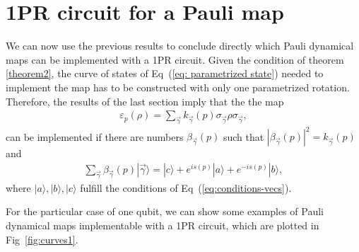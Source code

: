 \documentclass[10pt,letterpaper]{article} %
\newcommand{\fref}[1]{Fig~\ref{#1}}
\newcommand{\eref}[1]{Eq~(\ref{#1})}
\begin{document}
\section{1PR circuit for a Pauli map} %
\label{sec: 1PR circuit for a Pauli map}

We can now use the previous results to conclude directly which Pauli dynamical maps
can be implemented with a 1PR circuit.
Given the condition of theorem \ref{theorem2}, the curve of states of \eref{eq: parametrized state}  needed 
to implement the map
has to be constructed with only one parametrized rotation. 
Therefore, the results of the last section imply that the the map
\begin{eqnarray}
\varepsilon_p(\rho) = \sum_{\vec{\gamma}} k_{\vec{\gamma}}(p) \sigma_{\vec{\gamma}} \rho \sigma_{\vec{\gamma}},
\end{eqnarray}
can be implemented  if there are numbers $\beta_{\vec{\gamma}}(p)$ such that $|\beta_{\vec{\gamma}}(p)|^2 = k_{\vec{\gamma}}(p)$ and
\begin{eqnarray}
\label{eq:vec}
\sum_{\vec{\gamma}} \beta_{\vec{\gamma}}(p) |\vec{\gamma}\rangle = |c\rangle +  e^{is(p)} |a\rangle + e^{-is(p)}|b\rangle,
\end{eqnarray}
where $|a\rangle,|b\rangle,|c\rangle$ fulfill
the conditions of \eref{eq:conditions-vecs}.

For the particular case of one qubit, we can show some examples of Pauli
dynamical maps implementable with a 1PR circuit, which are plotted in
\fref{fig:curves1}. 
\end{document}
